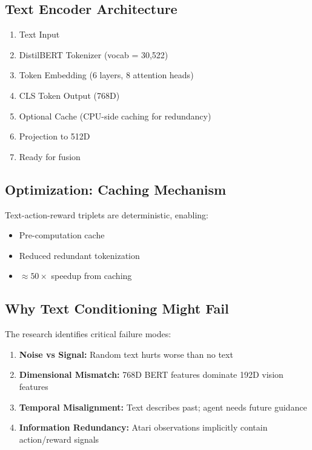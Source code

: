 \documentclass[12pt,a4paper,openany]{report}
\begin{document}
\subsection{Text Encoder Architecture}

\begin{enumerate}
    \item Text Input
    \item DistilBERT Tokenizer (vocab = 30,522)
    \item Token Embedding (6 layers, 8 attention heads)
    \item CLS Token Output (768D)
    \item Optional Cache (CPU-side caching for redundancy)
    \item Projection to 512D
    \item Ready for fusion
\end{enumerate}

\subsection{Optimization: Caching Mechanism}

Text-action-reward triplets are deterministic, enabling:

\begin{itemize}
    \item Pre-computation cache
    \item Reduced redundant tokenization
    \item $\approx 50\times$ speedup from caching
\end{itemize}

\subsection{Why Text Conditioning Might Fail}

The research identifies critical failure modes:

\begin{enumerate}
    \item \textbf{Noise vs Signal:} Random text hurts worse than no text
    \item \textbf{Dimensional Mismatch:} 768D BERT features dominate 192D vision features
    \item \textbf{Temporal Misalignment:} Text describes past; agent needs future guidance
    \item \textbf{Information Redundancy:} Atari observations implicitly contain action/reward signals
\end{enumerate}
\end{document}
